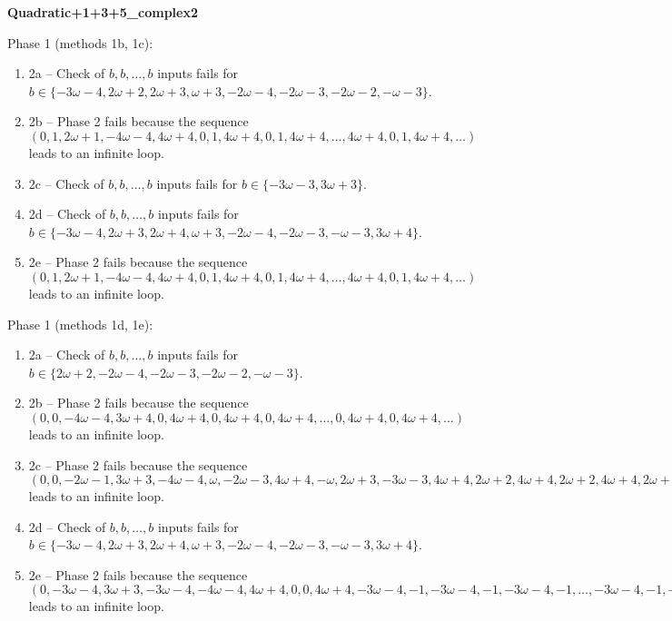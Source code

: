 \begin{exmp}
\label{ex:compareAO}

\textbf{Quadratic+1+3+5\_complex2 }

Phase 1 (methods 1b, 1c):
\begin{enumerate}[ ]
\item  2a -- Check of $b,b,\dots,b$ inputs fails for $b\in \{-3\omega - 4, 2\omega + 2, 2\omega + 3, \omega + 3, -2\omega - 4, -2\omega - 3, -2\omega - 2, -\omega - 3\}$.
\item  2b -- Phase 2   fails because  the sequence $(0, 1, 2\omega + 1, -4\omega - 4, 4\omega + 4, 0, 1, 4\omega + 4, 0, 1, 4\omega + 4, \dots ,4\omega + 4, 0, 1, 4\omega + 4, \dots)$ leads to an infinite loop.
\item  2c -- Check of $b,b,\dots,b$ inputs fails for $b\in \{-3\omega - 3, 3\omega + 3\}$.
\item  2d -- Check of $b,b,\dots,b$ inputs fails for $b\in \{-3\omega - 4, 2\omega + 3, 2\omega + 4, \omega + 3, -2\omega - 4, -2\omega - 3, -\omega - 3, 3\omega + 4\}$.
\item  2e -- Phase 2   fails because  the sequence $(0, 1, 2\omega + 1, -4\omega - 4, 4\omega + 4, 0, 1, 4\omega + 4, 0, 1, 4\omega + 4, \dots ,4\omega + 4, 0, 1, 4\omega + 4, \dots)$ leads to an infinite loop.
\end{enumerate}


Phase 1 (methods 1d, 1e):
\begin{enumerate}[ ]
\item  2a -- Check of $b,b,\dots,b$ inputs fails for $b\in \{2\omega + 2, -2\omega - 4, -2\omega - 3, -2\omega - 2, -\omega - 3\}$.
\item  2b -- Phase 2   fails because  the sequence $(0, 0, -4\omega - 4, 3\omega + 4, 0, 4\omega + 4, 0, 4\omega + 4, 0, 4\omega + 4, \dots ,0, 4\omega + 4, 0, 4\omega + 4, \dots)$ leads to an infinite loop.
\item  2c -- Phase 2   fails because  the sequence $(0, 0, -2\omega - 1, 3\omega + 3, -4\omega - 4, \omega, -2\omega - 3, 4\omega + 4, -\omega, 2\omega + 3, -3\omega - 3, 4\omega + 4, 2\omega + 2, 4\omega + 4, 2\omega + 2, 4\omega + 4, 2\omega + 2, \dots ,4\omega + 4, 2\omega + 2, 4\omega + 4, 2\omega + 2, \dots)$ leads to an infinite loop.
\item  2d -- Check of $b,b,\dots,b$ inputs fails for $b\in \{-3\omega - 4, 2\omega + 3, 2\omega + 4, \omega + 3, -2\omega - 4, -2\omega - 3, -\omega - 3, 3\omega + 4\}$.
\item  2e -- Phase 2   fails because  the sequence $(0, -3\omega - 4, 3\omega + 3, -3\omega - 4, -4\omega - 4, 4\omega + 4, 0, 0, 4\omega + 4, -3\omega - 4, -1, -3\omega - 4, -1, -3\omega - 4, -1, \dots ,-3\omega - 4, -1, -3\omega - 4, -1, \dots)$ leads to an infinite loop.
\end{enumerate}



\end{exmp}
